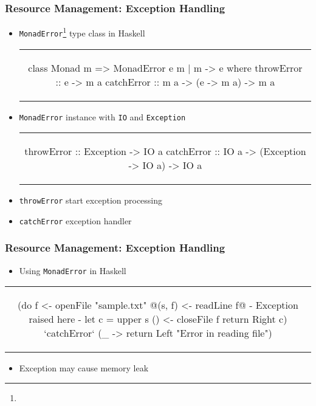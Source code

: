 \begin{frame}[fragile, c]
  \frametitle{Resource Management: Exception Handling}
  \begin{center}
    \begin{itemize}
    \item \texttt{MonadError}\footnote[frame]{}  type class in Haskell
      \begin{tabular}[c]{c}
        \begin{haskell}
      class Monad m => MonadError e m | m -> e where
          throwError :: e -> m a
          catchError :: m a -> (e -> m a) -> m a
        \end{haskell}
      \end{tabular}

    \item\texttt{MonadError} instance with \texttt{IO} and \texttt{Exception}
      \begin{tabular}[c]{c}
        \begin{haskell}
          throwError :: Exception -> IO a
          catchError :: IO a -> (Exception -> IO a) -> IO a
        \end{haskell}
      \end{tabular}

    \item \texttt{throwError} start exception processing
    \item \texttt{catchError} exception handler
    \end{itemize}
  \end{center}
\end{frame}

\begin{frame}[fragile, c]
  \frametitle{Resource Management: Exception Handling}
  \begin{center}

  \begin{itemize}
  \item Using \texttt{MonadError} in Haskell
  \end{itemize}
  \begin{tabular}[h]{c}
    \begin{haskell}
  (do f <- openFile "sample.txt"
     @(s, f)  <- readLine f@         {- Exception raised here -}
      let c = upper s
      () <- closeFile f
      return \dollar Right c)
          `catchError` (\_ ->
                 return \dollar Left "Error in reading file")
     \end{haskell}
  \end{tabular}
  \begin{itemize}
  \item Exception may cause memory leak
  \end{itemize}
  \end{center}
\end{frame}

